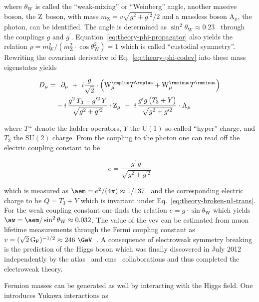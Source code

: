 where $\theta_\mathrm{W}$ is called the ``weak-mixing'' or ``Weinberg'' angle, another massive boson, the $\mathrm{Z}$~boson, with mass $m_\mathrm{Z}=v\sqrt{g^2+g^{\prime2}}/2$ and a massless boson $\mathrm{A}_\mu$, the photon, can be identified. The angle is determined as $\sin^2\theta_\mathrm{W} \approx 0.23$~\cite{Olive:2016xmw} through the couplings $g$ and $g^\prime$. Equation~\ref{eq:theory-phi-propagator} also yields the relation $\rho=m_\mathrm{W}^{2}/(m_\mathrm{Z}^{2}\cdot\cos\theta_\mathrm{W}^{2})=1$ which is called ``custodial symmetry''. Rewriting the covariant derivative of Eq.~\ref{eq:theory-phi-codev} into these mass eigenstates yields

\begin{align}
D_\mu=&\hphantom{-}\partial_\mu~+~i\frac{g}{\sqrt{2}}\cdot\Big(\mathrm{W}^{\rmplus}_\mu T^{\rmplus}+\mathrm{W}^{\rmminus}_\mu T^{\rmminus}\Big)\nonumber\\
&-i\,\frac{g^2\,T_3-g^{\prime 2}\,Y}{\sqrt{g^2+g^{\prime 2}}}\cdot\mathrm{Z}_\mu~-~i\,\frac{g^{\prime}g\,\big(T_3+Y\big)}{\sqrt{g^2+g^{\prime 2}}}\cdot \mathrm{A}_\mu \label{eq:theory-codev-breaking}
\end{align}

where $T^{\pm}$ denote the ladder operators, $Y$ the $\mathrm{U(1)}$ so-called ``hyper'' charge, and $T_3$ the $\mathrm{SU(2)}$ charge. From the coupling to the photon one can read off the electric coupling constant to be 

\begin{equation}
e=\frac{g^{\prime}\,g}{\sqrt{g^2+g^{\prime 2}}}
\end{equation}

which is measured as $\aem=e^2/(4\pi)\approx1/137$~\cite{Olive:2016xmw} and the corresponding electric charge to be $Q=T_3+Y$ which is invariant under Eq.~\ref{eq:theory-broken-u1-trans}. For the weak coupling constant one finds the relation $e=g\cdot\sin\theta_\mathrm{W}$ which yields $\aw=\aem/\sin^2\theta_\mathrm{W}\approx0.032$. The value of the \gls{vev} can be estimated from muon lifetime measurements through the Fermi coupling constant as $v=(\sqrt{2}\,\mathrm{G}_\mathrm{F})^{-1/2}\approx 246~\GeV$~\cite{PhysRevLett.106.041803}. A consequence of electroweak symmetry breaking is the prediction of the Higgs boson which was finally discovered in July 2012 independently by the \gls{atlas}~\cite{Aad:2012tfa} and \gls{cms}~\cite{Chatrchyan:2012xdj} collaborations and thus completed the electroweak theory.


Fermion masses can be generated as well by interacting with the Higgs field. One introduces Yukawa interactions as

